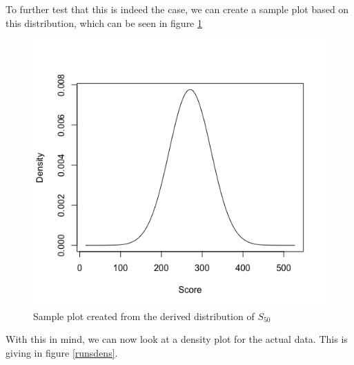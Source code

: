 To further test that this is indeed the case, we can create a sample plot based on this distribution, which can be seen in figure \ref{samplenorm}

\begin{figure}[h]
    \label{samplenorm}
    \centering
    \includegraphics[scale=0.5]{figures/samplenorm.png}
    \caption{Sample plot created from the derived distribution of $S_{50}$}
\end{figure}

With this in mind, we can now look at a density plot for the actual data. This is giving in figure \ref{runsdens}.

\begin{figure}[h]
    \centering
    \qquad
    \label{errDistAndQQ}
\end{figure}

